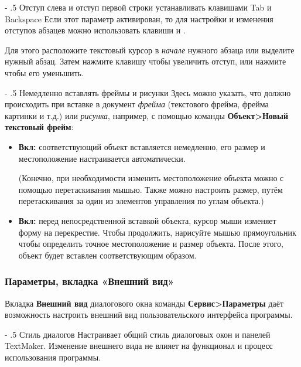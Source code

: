 ﻿\documentclass[a4paper,10pt]{article}
\makeatletter
\renewcommand\paragraph{%
   \@startsection{paragraph}{4}{0mm}%
      {-\baselineskip}%
      {.5\baselineskip}%
      {\normalfont\normalsize\bfseries}}
\makeatother
\begin{document}
\paragraph{Отступ слева и отступ первой строки устанавливать клавишами Tab и Backspace}
Если этот параметр активирован, то для настройки и изменения отступов абзацев можно использовать клавиши  и .

Для этого расположите текстовый курсор в \textit{начале} нужного абзаца или выделите нужный абзац. Затем нажмите клавишу  чтобы увеличить отступ, или нажмите  чтобы его уменьшить.

\paragraph{Немедленно вставлять фреймы и рисунки}
Здесь можно указать, что должно происходить при вставке в документ \textit{фрейма} (текстового фрейма, фрейма картинки и т.д.) или \textit{рисунка}, например, с помощью команды  \textbf{Объект>Новый текстовый фрейм}:

\begin{itemize}
 \item \textbf{Вкл:} соответствующий объект вставляется немедленно, его размер и местоположение настраивается автоматически.
 
 (Конечно, при необходимости изменить местоположение объекта можно с помощью перетаскивания мышью. Также можно настроить размер, путём перетаскивания за один из элементов управления по углам объекта.)
 \item \textbf{Вкл:} перед непосредственной вставкой объекта, курсор мыши изменяет форму на перекрестие. Чтобы продолжить, нарисуйте мышью прямоугольник чтобы определить точное местоположение и размер объекта. После этого, объект будет вставлен соответствующим образом.
\end{itemize}
 
\subsubsection{Параметры, вкладка «Внешний вид»}
Вкладка \textbf{Внешний вид} диалогового окна команды \textbf{Сервис>Параметры} даёт возможность настроить внешний вид пользовательского интерфейса программы.

\paragraph{Стиль диалогов}
Настраивает общий стиль диалоговых окон и панелей TextMaker. Изменение внешнего вида не влияет на функционал и процесс использования программы.
\end{document}
